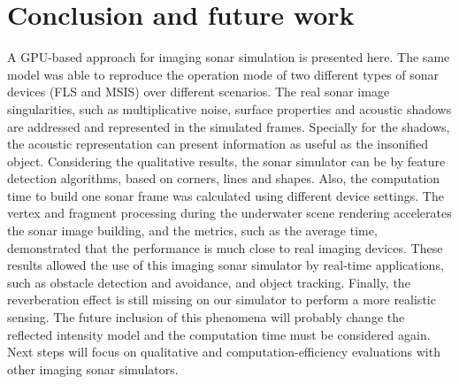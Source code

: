 \documentclass[final,5p,times]{elsarticle}
\begin{document}

\section{Conclusion and future work}
\label{conclusion}

A GPU-based approach for imaging sonar simulation is presented here. The same model was able to reproduce the operation mode of two different types of sonar devices (FLS and MSIS) over different scenarios. The real sonar image singularities, such as multiplicative noise, surface properties and acoustic shadows are addressed and represented in the simulated frames. Specially for the shadows, the acoustic representation can present information as useful as the insonified object. Considering the qualitative results, the sonar simulator can be by feature detection algorithms, based on corners, lines and shapes. Also, the computation time to build one sonar frame was calculated using different device settings. The vertex and fragment processing during the underwater scene rendering accelerates the sonar image building, and the metrics, such as the average time, demonstrated that the performance is much close to real imaging devices. These results allowed the use of this imaging sonar simulator by real-time applications, such as obstacle detection and avoidance, and object tracking. Finally, the reverberation effect is still missing on our simulator to perform a more realistic sensing. The future inclusion of this phenomena will probably change the reflected intensity model and the computation time must be considered again. Next steps will focus on qualitative and computation\hyp{}efficiency evaluations with other imaging sonar simulators.









\end{document}
